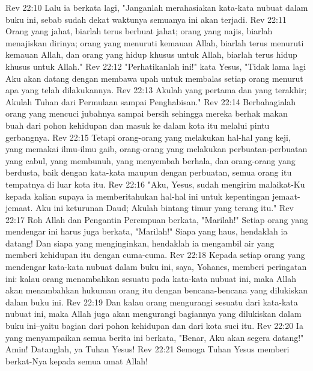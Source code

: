 Rev 22:10  Lalu ia berkata lagi, "Janganlah merahasiakan kata-kata nubuat dalam buku ini, sebab sudah dekat waktunya semuanya ini akan terjadi.
Rev 22:11  Orang yang jahat, biarlah terus berbuat jahat; orang yang najis, biarlah menajiskan dirinya; orang yang menuruti kemauan Allah, biarlah terus menuruti kemauan Allah, dan orang yang hidup khusus untuk Allah, biarlah terus hidup khusus untuk Allah."
Rev 22:12  "Perhatikanlah ini!" kata Yesus, "Tidak lama lagi Aku akan datang dengan membawa upah untuk membalas setiap orang menurut apa yang telah dilakukannya.
Rev 22:13  Akulah yang pertama dan yang terakhir; Akulah Tuhan dari Permulaan sampai Penghabisan."
Rev 22:14  Berbahagialah orang yang mencuci jubahnya sampai bersih sehingga mereka berhak makan buah dari pohon kehidupan dan masuk ke dalam kota itu melalui pintu gerbangnya.
Rev 22:15  Tetapi orang-orang yang melakukan hal-hal yang keji, yang memakai ilmu-ilmu gaib, orang-orang yang melakukan perbuatan-perbuatan yang cabul, yang membunuh, yang menyembah berhala, dan orang-orang yang berdusta, baik dengan kata-kata maupun dengan perbuatan, semua orang itu tempatnya di luar kota itu.
Rev 22:16  "Aku, Yesus, sudah mengirim malaikat-Ku kepada kalian supaya ia memberitahukan hal-hal ini untuk kepentingan jemaat-jemaat. Aku ini keturunan Daud; Akulah bintang timur yang terang itu."
Rev 22:17  Roh Allah dan Pengantin Perempuan berkata, "Marilah!" Setiap orang yang mendengar ini harus juga berkata, "Marilah!" Siapa yang haus, hendaklah ia datang! Dan siapa yang menginginkan, hendaklah ia mengambil air yang memberi kehidupan itu dengan cuma-cuma.
Rev 22:18  Kepada setiap orang yang mendengar kata-kata nubuat dalam buku ini, saya, Yohanes, memberi peringatan ini: kalau orang menambahkan sesuatu pada kata-kata nubuat ini, maka Allah akan menambahkan hukuman orang itu dengan bencana-bencana yang dilukiskan dalam buku ini.
Rev 22:19  Dan kalau orang mengurangi sesuatu dari kata-kata nubuat ini, maka Allah juga akan mengurangi bagiannya yang dilukiskan dalam buku ini--yaitu bagian dari pohon kehidupan dan dari kota suci itu.
Rev 22:20  Ia yang menyampaikan semua berita ini berkata, "Benar, Aku akan segera datang!" Amin! Datanglah, ya Tuhan Yesus!
Rev 22:21  Semoga Tuhan Yesus memberi berkat-Nya kepada semua umat Allah!


